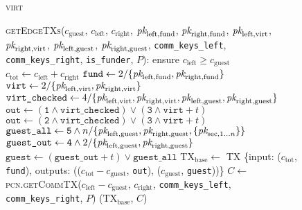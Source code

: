 \begin{figure}[H]
  \begin{processbox}{\textsc{virt}}
    \begin{algorithmic}[1]
      \State {}
      \State \textsc{getEdgeTXs}($c_{\mathrm{guest}}$, $c_{\mathrm{left}}$,
      $c_{\mathrm{right}}$, $\textit{pk}_{\mathrm{left}, \mathrm{fund}}$,
      $\textit{pk}_{\mathrm{right}, \mathrm{fund}}$, $\textit{pk}_{\mathrm{left}, \mathrm{virt}}$,
      $\textit{pk}_{\mathrm{right}, \mathrm{virt}}$, $\textit{pk}_{\mathrm{left},
      \mathrm{guest}}$, $\textit{pk}_{\mathrm{right}, \mathrm{guest}}$,
      \texttt{comm\_keys\_left}, \texttt{comm\_keys\_right},
      \texttt{is\_funder}, $P$):
      \Indent
        \State ensure $c_{\mathrm{left}} \geq c_{\mathrm{guest}}$
        \State $c_{\mathrm{tot}} \gets c_{\mathrm{left}} + c_{\mathrm{right}}$
        \State $\texttt{fund} \gets 2/\{\textit{pk}_{\mathrm{left}, \mathrm{fund}},
        \textit{pk}_{\mathrm{right}, \mathrm{fund}}\}$
        \State $\texttt{virt} \gets 2/\{\textit{pk}_{\mathrm{left}, \mathrm{virt}},
        \textit{pk}_{\mathrm{right}, \mathrm{virt}}\}$
        \State $\texttt{virt\_checked} \gets 4/\{\textit{pk}_{\mathrm{left},
        \mathrm{virt}}, \textit{pk}_{\mathrm{right}, \mathrm{virt}}, \textit{pk}_{\mathrm{left},
        \mathrm{guest}}, \textit{pk}_{\mathrm{right}, \mathrm{guest}}\}$
          \State $\texttt{out} \gets (\texttt{1} \wedge \texttt{virt\_checked})
          \vee (\texttt{3} \wedge \texttt{virt} + t)$
        \Else \: 
          \State $\texttt{out} \gets (\texttt{2} \wedge \texttt{virt\_checked})
          \vee (\texttt{3} \wedge \texttt{virt} + t)$
        \EndIf
        \State $\texttt{guest\_all} \gets \texttt{5} \wedge
        n/\{\textit{pk}_{\mathrm{left}, \mathrm{guest}}, \textit{pk}_{\mathrm{right},
        \mathrm{guest}}, \{\textit{pk}_{\mathrm{sec}, 1 \dots n}\}\}$
        \State $\texttt{guest\_out} \gets \texttt{4} \wedge
        2/\{\textit{pk}_{\mathrm{left}, \mathrm{guest}}, \textit{pk}_{\mathrm{right},
        \mathrm{guest}}\}$
        \State $\texttt{guest} \gets (\texttt{guest\_out} + t) \vee
        \texttt{guest\_all}$
        \State $\mathrm{TX}_{\mathrm{base}} \gets$ TX \{input:
        ($c_{\mathrm{tot}}$, \texttt{fund}), outputs: (($c_{\mathrm{tot}} -
        c_{\mathrm{guest}}$, \texttt{out}), ($c_{\mathrm{guest}}$,
        \texttt{guest}))\}
        \State $C \gets$ \textsc{pcn.getCommTX}($c_{\mathrm{left}} -
        c_{\mathrm{guest}}$, $c_{\mathrm{right}}$, \texttt{comm\_keys\_left},
        \texttt{comm\_keys\_right}, $P$)
        \State \Return ($\mathrm{TX}_{\mathrm{base}}$, $C$)
      \EndIndent
    \end{algorithmic}
  \end{processbox}
  \caption{}
  \label{code:virtual-layer:edge-txs}
\end{figure}

